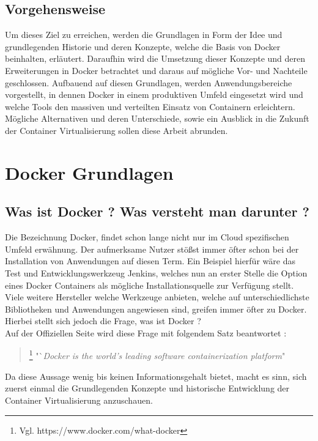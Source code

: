 \documentclass[12pt,toc=bib,toc=listof]{scrreprt}
\begin{document}

\section{Vorgehensweise} %
\label{sec:vorgehensweise}

Um dieses Ziel zu erreichen, werden die Grundlagen in Form der Idee und grundlegenden Historie und deren Konzepte, welche die Basis von Docker beinhalten, erläutert.
Daraufhin wird die Umsetzung dieser Konzepte und deren Erweiterungen in Docker betrachtet und daraus auf mögliche Vor- und Nachteile geschlossen.
Aufbauend auf diesen Grundlagen, werden Anwendungsbereiche vorgestellt, in dennen Docker in einem produktiven Umfeld eingesetzt wird und welche Tools den massiven und verteilten Einsatz von Containern erleichtern.
Mögliche Alternativen und deren Unterschiede, sowie ein Ausblick in die Zukunft der Container Virtualisierung sollen diese Arbeit abrunden.




\chapter{Docker Grundlagen} %
\label{sec:grundlagen}

\section{Was ist Docker ? Was versteht man darunter ?}
Die Bezeichnung Docker, findet schon lange nicht nur im Cloud spezifischen Umfeld erwähnung.
Der aufmerksame Nutzer stößst immer öfter schon bei der Installation von Anwendungen auf diesen Term.
Ein Beispiel hierfür wäre das Test und Entwicklungswerkzeug Jenkins, welches nun an erster Stelle die Option eines Docker Containers als mögliche Installationsquelle zur Verfügung stellt. \cite{jenkins}
Viele weitere Hersteller welche Werkzeuge anbieten, welche auf unterschiedlichste Bibliotheken und Anwendungen angewiesen sind, greifen immer öfter zu Docker. 
Hierbei stellt sich jedoch die Frage, was ist Docker ? \\
Auf der Offiziellen Seite wird diese Frage mit folgendem Satz beantwortet :

\begin{quote}
	\footnote[1]{Vgl. https://www.docker.com/what-docker}
	"`\textit{Docker is the world's leading software containerization platform}"
\end{quote}
Da diese Aussage wenig bis keinen Informationsgehalt bietet, macht es sinn, sich zuerst einmal die Grundlegenden Konzepte und historische Entwicklung der Container Virtualisierung anzuschauen. 
\end{document}
